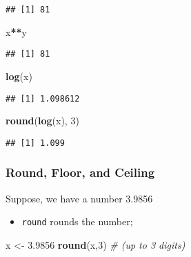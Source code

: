 \documentclass[
]{book}
\newenvironment{Shaded}{\begin{snugshade}}{\end{snugshade}}
\newcommand{\CommentTok}[1]{\textcolor[rgb]{0.56,0.35,0.01}{\textit{#1}}}
\newcommand{\DecValTok}[1]{\textcolor[rgb]{0.00,0.00,0.81}{#1}}
\newcommand{\FloatTok}[1]{\textcolor[rgb]{0.00,0.00,0.81}{#1}}
\newcommand{\KeywordTok}[1]{\textcolor[rgb]{0.13,0.29,0.53}{\textbf{#1}}}
\newcommand{\NormalTok}[1]{#1}
\newcommand{\OperatorTok}[1]{\textcolor[rgb]{0.81,0.36,0.00}{\textbf{#1}}}
\newcommand{\StringTok}[1]{\textcolor[rgb]{0.31,0.60,0.02}{#1}}
\providecommand{\tightlist}{%
  \setlength{\itemsep}{0pt}\setlength{\parskip}{0pt}}
\begin{document}
\begin{verbatim}
## [1] 81
\end{verbatim}

\begin{Shaded}
\begin{Highlighting}[]
\NormalTok{x}\OperatorTok{**}\NormalTok{y}
\end{Highlighting}
\end{Shaded}

\begin{verbatim}
## [1] 81
\end{verbatim}

\begin{Shaded}
\begin{Highlighting}[]
\KeywordTok{log}\NormalTok{(x)}
\end{Highlighting}
\end{Shaded}

\begin{verbatim}
## [1] 1.098612
\end{verbatim}

\begin{Shaded}
\begin{Highlighting}[]
\KeywordTok{round}\NormalTok{(}\KeywordTok{log}\NormalTok{(x), }\DecValTok{3}\NormalTok{)}
\end{Highlighting}
\end{Shaded}

\begin{verbatim}
## [1] 1.099
\end{verbatim}

\hypertarget{round-floor-and-ceiling}{%
\subsubsection{Round, Floor, and Ceiling}\label{round-floor-and-ceiling}}

Suppose, we have a number 3.9856

\begin{itemize}
\tightlist
\item
  \texttt{round} rounds the number;
\end{itemize}

\begin{Shaded}
\begin{Highlighting}[]
\NormalTok{x <-}\StringTok{ }\FloatTok{3.9856}
\KeywordTok{round}\NormalTok{(x,}\DecValTok{3}\NormalTok{) }\CommentTok{# (up to 3 digits)}
\end{Highlighting}
\end{Shaded}
\end{document}
